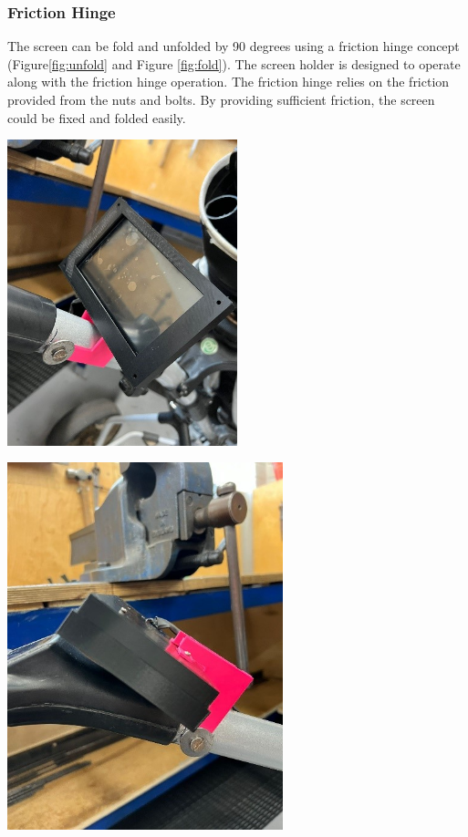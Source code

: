 \documentclass[11pt,landscape]{article}
\newenvironment{Figure}
  {\par\medskip\noindent\minipage{\linewidth}}
  {\endminipage\par\medskip}
\begin{document}
\begin{multicols}{3}
    
    
    \subsubsection{Friction Hinge}
    The screen can be fold and unfolded by 90 degrees using a friction hinge
    concept (Figure\ref{fig:unfold} and Figure \ref{fig:fold}). The screen
    holder is designed to operate along with the friction hinge operation. The
    friction hinge relies on the friction provided from the nuts and bolts. By
    providing sufficient friction, the screen could be fixed and folded easily.
    
    \begin{Figure}
        \begin{center}
            \includegraphics[width=0.5\textwidth]{Figure17.jpg}
            \label{fig:unfold}
        \end{center}
    \end{Figure}
    
    \begin{Figure}
        \begin{center}
            \includegraphics[width=0.6\textwidth]{Figure18.jpg}
            \label{fig:fold}
        \end{center}
    \end{Figure}
    

\end{multicols}
\end{document}
